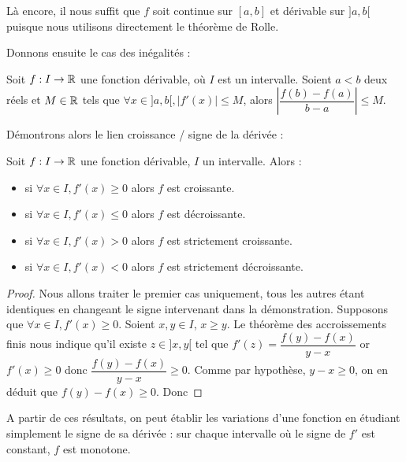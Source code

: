 \begin{rmk}
    Là encore, il nous suffit que $f$ soit continue sur $[a,b]$ et dérivable sur $]a,b[$ puisque nous utilisons directement le théorème de Rolle.
\end{rmk}

Donnons ensuite le cas des inégalités :

\begin{prop}
    Soit $f : I \to\mathbb{R}$ une fonction dérivable, où $I$ est un intervalle. Soient $a < b$ deux réels et $M \in\mathbb{R}$ tels que $\forall x \in ]a,b[, |f'(x)| \leq M$, alors $\left|\dfrac{f(b)-f(a)}{b-a}\right|\leq M$.
\end{prop}

Démontrons alors le lien croissance / signe de la dérivée :

\begin{prop}
    Soit $f : I \to\mathbb{R}$ une fonction dérivable, $I$ un intervalle. Alors :
    \begin{itemize}[label=$\bullet$]
        \item si $\forall x \in I, f'(x) \geq 0$ alors $f$ est croissante.
        \item si $\forall x \in I, f'(x) \leq 0$ alors $f$ est décroissante.
        \item si $\forall x \in I, f'(x) > 0$ alors $f$ est strictement croissante.
        \item si $\forall x \in I, f'(x) < 0$ alors $f$ est strictement décroissante.
    \end{itemize}
\end{prop}

\begin{proof}
    Nous allons traiter le premier cas uniquement, tous les autres étant identiques en changeant le signe intervenant dans la démonstration.
    Supposons que $\forall x \in I, f'(x) \geq 0$. Soient $x,y\in I$, $x\geq y$. Le théorème des accroissements finis nous indique qu'il existe $z\in]x,y[$ tel que $f'(z) = \dfrac{f(y)-f(x)}{y-x}$ or $f'(x) \geq 0$ donc $\dfrac{f(y)-f(x)}{y-x}\geq 0$. Comme par hypothèse, $y-x \geq 0$, on en déduit que $f(y)-f(x) \geq 0$. Donc 
\end{proof}

\begin{rmk}
    A partir de ces résultats, on peut établir les variations d'une fonction en étudiant simplement le signe de sa dérivée : sur chaque intervalle où le signe de $f'$ est constant, $f$ est monotone.
\end{rmk}

\newpage